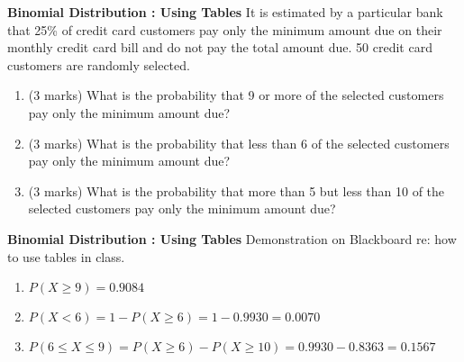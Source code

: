 \documentclass[a4]{beamer}
\begin{document}
{
\textbf{Binomial Distribution : Using Tables}
It is estimated by a particular bank that 25\% of credit card customers pay only the minimum amount due on their monthly credit card bill and do not pay the total amount due. 50 credit card customers are randomly selected.
\begin{enumerate}
\item (3 marks)	What is the probability that 9 or more of the selected customers pay only the minimum amount due?
\item (3 marks) What is the probability that less than 6 of the selected customers pay only the minimum amount due?
\item (3 marks)	What is the probability that more than 5 but less than 10 of the selected customers pay only the minimum amount due?
\end{enumerate}

}

{
\textbf{Binomial Distribution : Using Tables}
Demonstration on Blackboard re: how to use tables in class.
\begin{enumerate}
\item $P(X \geq 9) = 0.9084$
\item $P(X < 6) = 1- P(X \geq 6) =1 - 0.9930 = 0.0070$
\item $P(6 \leq X \leq 9) = P(X \geq 6) - P(X \geq 10) = 0.9930 - 0.8363 = 0.1567$
\end{enumerate}

}
\end{document}
